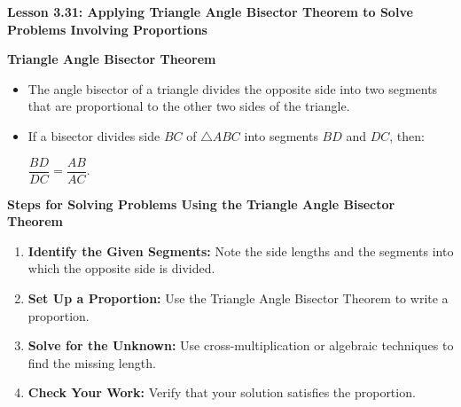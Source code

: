 \begin{center}
\textbf{Lesson 3.31: Applying Triangle Angle Bisector Theorem to Solve Problems Involving Proportions}
\end{center}

\vspace*{-1.5ex}

\noindent\textbf{Triangle Angle Bisector Theorem}
\begin{itemize}%
    \item The angle bisector of a triangle divides the opposite side into two segments that are proportional to the other two sides of the triangle.
    \item If a bisector divides side \(BC\) of \(\triangle ABC\) into segments \(BD\) and \(DC\), then:
      
    {\centering $ 
    \dfrac{BD}{DC} = \dfrac{AB}{AC}.
     $\par}
\end{itemize}

\noindent\textbf{Steps for Solving Problems Using the Triangle Angle Bisector Theorem}
\begin{enumerate}
    \item \textbf{Identify the Given Segments:} Note the side lengths and the segments into which the opposite side is divided.
    \item \textbf{Set Up a Proportion:} Use the Triangle Angle Bisector Theorem to write a proportion.
    \item \textbf{Solve for the Unknown:} Use cross-multiplication or algebraic techniques to find the missing length.
    \item \textbf{Check Your Work:} Verify that your solution satisfies the proportion.
\end{enumerate}
